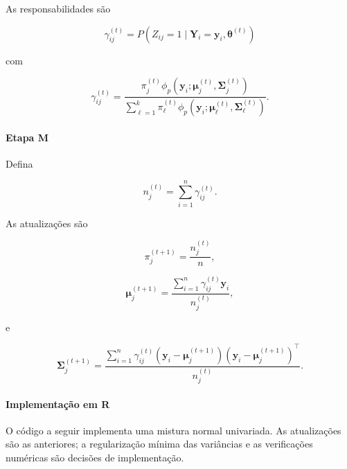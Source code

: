 \documentclass[
  letterpaper,
  DIV=11,
  numbers=noendperiod]{scrreprt}
\let\oldparagraph\paragraph
\renewcommand{\paragraph}[1]{\oldparagraph{#1}\mbox{}}
\begin{document}
As responsabilidades são

\[\gamma_{ij}^{(t)}
=
P(Z_{ij}=1\mid\boldsymbol{Y}_i=\boldsymbol{y}_i,\boldsymbol{\theta}^{(t)})\]

com

\[\gamma_{ij}^{(t)}
=
\frac{
\pi_j^{(t)}
\phi_p
(\boldsymbol{y}_i;\boldsymbol{\mu}_j^{(t)},\boldsymbol{\Sigma}_j^{(t)})
}{
\displaystyle
\sum_{\ell=1}^k
\pi_\ell^{(t)}
\phi_p
(\boldsymbol{y}_i;\boldsymbol{\mu}_\ell^{(t)},\boldsymbol{\Sigma}_\ell^{(t)})
}.\]

\paragraph{Etapa M}\label{etapa-m}

Defina

\[n_j^{(t)}
=
\sum_{i=1}^n\gamma_{ij}^{(t)}.\]

As atualizações são

\[\pi_j^{(t+1)}
=
\frac{n_j^{(t)}}{n},\]

\[\boldsymbol{\mu}_j^{(t+1)}
=
\frac{
\displaystyle
\sum_{i=1}^n
\gamma_{ij}^{(t)}\boldsymbol{y}_i
}{
n_j^{(t)}
},\]

e

\[\boldsymbol{\Sigma}_j^{(t+1)}
=
\frac{
\displaystyle
\sum_{i=1}^n
\gamma_{ij}^{(t)}
(\boldsymbol{y}_i-\boldsymbol{\mu}_j^{(t+1)})
(\boldsymbol{y}_i-\boldsymbol{\mu}_j^{(t+1)})^\top
}{
n_j^{(t)}
}.\]

\paragraph{Implementação em R}\label{implementauxe7uxe3o-em-r}

O código a seguir implementa uma mistura normal univariada. As
atualizações são as anteriores; a regularização mínima das variâncias e
as verificações numéricas são decisões de implementação.
\end{document}
